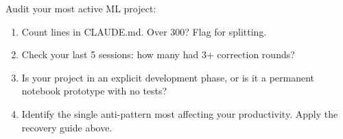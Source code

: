 \begin{trybox}
Audit your most active ML project:
\begin{enumerate}
  \item Count lines in CLAUDE.md. Over 300? Flag for splitting.
  \item Check your last 5 sessions: how many had 3+ correction rounds?
  \item Is your project in an explicit development phase, or is it a
    permanent notebook prototype with no tests?
  \item Identify the single anti-pattern most affecting your productivity.
    Apply the recovery guide above.
\end{enumerate}
\end{trybox}
